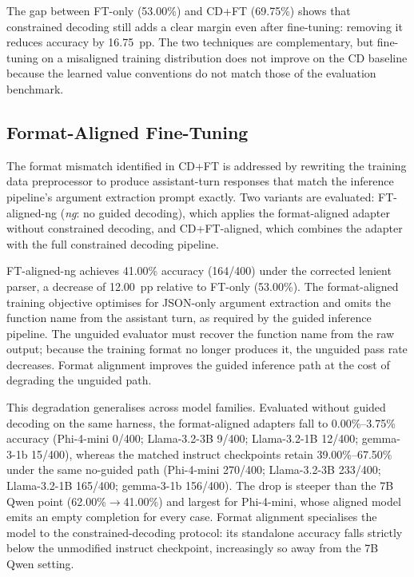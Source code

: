 The gap between FT-only (53.00\%) and CD+FT (69.75\%) shows
that constrained decoding still adds a clear margin even after fine-tuning:
removing it reduces accuracy by 16.75~pp. The two techniques
are complementary, but fine-tuning on a misaligned training distribution does
not improve on the CD baseline because the learned value conventions do not
match those of the evaluation benchmark.

\subsection{Format-Aligned Fine-Tuning}
\label{sec:format-aligned}

The format mismatch identified in CD+FT is addressed by rewriting
the training data preprocessor to produce assistant-turn responses that
match the inference pipeline's argument extraction prompt exactly.
Two variants are evaluated: FT-aligned-ng (\textit{ng}: no guided
decoding), which applies the format-aligned adapter without
constrained decoding, and CD+FT-aligned, which combines the
adapter with the full constrained decoding pipeline.

FT-aligned-ng achieves 41.00\% accuracy (164/400) under the corrected
lenient parser, a decrease of 12.00~pp relative to FT-only (53.00\%).
The format-aligned training objective
optimises for JSON-only argument extraction and omits the function name
from the assistant turn, as required by the guided inference pipeline.
The unguided evaluator must recover the function name from the raw output;
because the training format no longer produces it, the unguided pass rate
decreases. Format alignment improves the guided inference path at the cost
of degrading the unguided path.

This degradation generalises across model families. Evaluated without guided
decoding on the same harness, the format-aligned adapters fall to
0.00\%--3.75\% accuracy (Phi-4-mini 0/400; Llama-3.2-3B 9/400;
Llama-3.2-1B 12/400; gemma-3-1b 15/400), whereas the matched instruct
checkpoints retain 39.00\%--67.50\% under the same no-guided path
(Phi-4-mini 270/400; Llama-3.2-3B 233/400; Llama-3.2-1B 165/400;
gemma-3-1b 156/400). The drop is steeper than the 7B Qwen point
(62.00\%$\rightarrow$41.00\%) and largest for Phi-4-mini, whose aligned
model emits an empty completion for every case. Format alignment
specialises the model to the constrained-decoding protocol: its standalone
accuracy falls strictly below the unmodified instruct checkpoint,
increasingly so away from the 7B Qwen setting.

